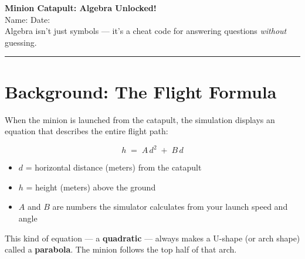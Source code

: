 \documentclass[12pt]{article}
\newcommand{\blank}[1][4cm]{\underline{\hspace{#1}}}
\begin{document}
\begin{center}
  {\LARGE\bfseries\color{minionBlue} Minion Catapult: Algebra Unlocked!}\\[6pt]
  {\large Name: \blank[7cm] \quad Date: \blank[3cm]}\\[4pt]
  {\normalsize\color{hintGray}
    Algebra isn't just symbols --- it's a cheat code for answering questions
    \emph{without} guessing.}
\end{center}

\vspace{6pt}\noindent\rule{\linewidth}{1pt}\vspace{6pt}

\section*{Background: The Flight Formula}

When the minion is launched from the catapult, the simulation displays an
equation that describes the entire flight path:

\[
  h \;=\; A\,d^2 \;+\; B\,d
\]

\begin{itemize}
  \item $d$ = horizontal distance (meters) from the catapult
  \item $h$ = height (meters) above the ground
  \item $A$ and $B$ are numbers the simulator calculates from your launch
        speed and angle
\end{itemize}

This kind of equation --- a \textbf{quadratic} --- always makes a U-shape
(or arch shape) called a \textbf{parabola}.  The minion follows the top half
of that arch.
\end{document}

